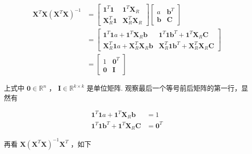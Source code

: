 \documentclass[UTF8]{ctexart}
\begin{document}
    \begin{equation}
    	\begin{aligned}
    		\boldsymbol{X}^T \boldsymbol{X} (\boldsymbol{X}^T \boldsymbol{X})^{-1} & = \begin{bmatrix}
    			\boldsymbol{1}^T \boldsymbol{1} & \boldsymbol{1}^T \boldsymbol{X}_R \\
    			\boldsymbol{X}_R^T \boldsymbol{1} & \boldsymbol{X}_R^T \boldsymbol{X}_R
    		\end{bmatrix} \begin{bmatrix}
    		    a & \boldsymbol{b}^T \\
    		    \boldsymbol{b} & \boldsymbol{C}
    		\end{bmatrix} \\
    	    & = \begin{bmatrix}
    	    	\boldsymbol{1}^T \boldsymbol{1} a + \boldsymbol{1}^T \boldsymbol{X}_R \boldsymbol{b} & \boldsymbol{1}^T \boldsymbol{1} \boldsymbol{b}^T + \boldsymbol{1}^T \boldsymbol{X}_R \boldsymbol{C} \\
    	    	\boldsymbol{X}_R^T \boldsymbol{1} a + \boldsymbol{X}_R^T \boldsymbol{X}_R \boldsymbol{b} & \boldsymbol{X}_R^T \boldsymbol{1} \boldsymbol{b}^T + \boldsymbol{X}_R^T \boldsymbol{X}_R \boldsymbol{C}
    	    \end{bmatrix} \\
            & = \begin{bmatrix}
            	1 & \boldsymbol{0}^T \\
            	\boldsymbol{0} & \boldsymbol{I}
            \end{bmatrix}
    	\end{aligned}
    \end{equation}

    上式中 $ \boldsymbol{0} \in \mathbb{R}^n $ ， $ \boldsymbol{I} \in \mathbb{R}^{k \times k} $ 是单位矩阵. 观察最后一个等号前后矩阵的第一行，显然有
    
    \begin{equation}
    	\begin{aligned}
    		\boldsymbol{1}^T \boldsymbol{1} a + \boldsymbol{1}^T \boldsymbol{X}_R \boldsymbol{b} & = 1 \\
    		\boldsymbol{1}^T \boldsymbol{1} \boldsymbol{b}^T + \boldsymbol{1}^T \boldsymbol{X}_R \boldsymbol{C} & = \boldsymbol{0}^T
    	\end{aligned}
    \end{equation}

    再看 $ \boldsymbol{X} (\boldsymbol{X}^T \boldsymbol{X})^{-1} \boldsymbol{X}^T $ ，如下
    
\end{document}
